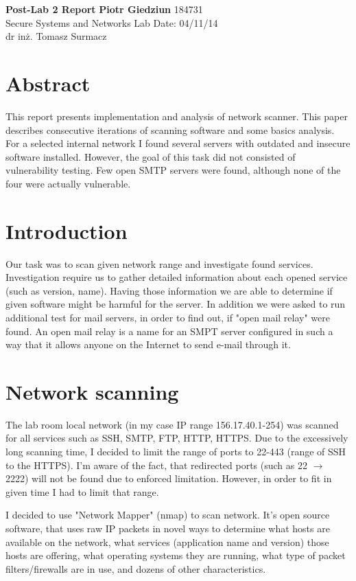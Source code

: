 \documentclass[a4paper, 11pt]{article}
\begin{document}
\noindent
\large\textbf{Post-Lab 2 Report} \hfill \textbf{Piotr Giedziun} 184731\\
\normalsize Secure Systems and Networks \hfill  Lab Date: 04/11/14 \\
dr inż. Tomasz Surmacz

\section*{Abstract}
This report presents implementation and analysis of network scanner. This paper describes consecutive iterations of scanning software and some basics analysis.
For a selected internal network I found several servers with outdated and insecure software installed. However, the goal of this task did not consisted of vulnerability testing. Few open SMTP servers were found, although none of the four were actually vulnerable.

\section*{Introduction}
Our task was to scan given network range and investigate found services. Investigation require us to gather detailed information about each opened service (such as version, name). Having those information we are able to determine if given software might be harmful for the server. 
In addition we were asked to run additional test for mail servers, in order to find out, if "open mail relay" were found.
An open mail relay is a name for an SMPT server configured in such a way that it allows anyone on the Internet to send e-mail through it.

\section*{Network scanning}

The lab room local network (in my case IP range 156.17.40.1-254) was scanned for all services such as SSH, SMTP, FTP, HTTP, HTTPS.
Due to the excessively long scanning time, I decided to limit the range of ports to 22-443 (range of SSH to the HTTPS).
I'm aware of the fact, that redirected ports (such as 22 $\rightarrow$ 2222) will not be found due to enforced limitation. However, in order to fit in given time I had to limit that range.

I decided to use "Network Mapper" (nmap) to scan network. It's open source software, that uses raw IP packets in novel ways to determine what hosts are available on the network, what services (application name and version) those hosts are offering, what operating systems they are running, what type of packet filters/firewalls are in use, and dozens of other characteristics.
\end{document}
